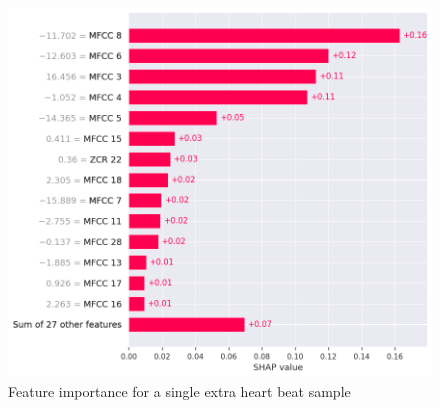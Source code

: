 \begin{figure}[H]
    \centering
    \includegraphics[width=0.8\columnwidth]{../images/extrahls_feature_importance.png}
    \caption{Feature importance for a single extra heart beat sample}
    \label{fig:extrahls_feature_importance}
\end{figure}